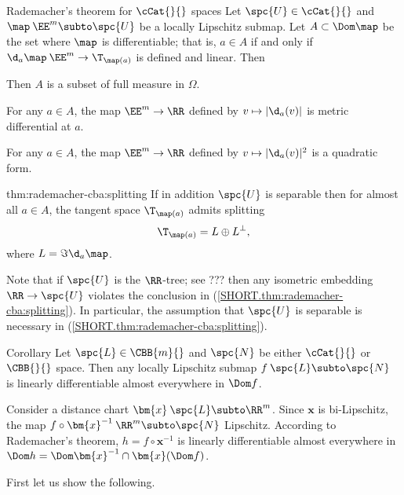 \begin{thm}{Rademacher's theorem for $\cCat{}{}$ spaces}\label{thm:rademacher-cba}
Let $\spc{U}\in\cCat{}{}$  
and $\map\:\EE^m\subto\spc{U}$ be a locally Lipschitz submap.
Let $A\subset \Dom \map$ be the set where $\map$ is differentiable;
that is, $a\in A$ if and only if $\d_a\map\:\EE^m\to\T_{\map(a)}$ is defined and linear.
Then 
\begin{subthm}{}
Then $A$ is a subset of full measure in $\Omega$.
\end{subthm}

\begin{subthm}{}
For any $a\in A$,
the map $\EE^m\to\RR$ defined by $v\mapsto |\d_a(v)|$ is metric differential at $a$.
\end{subthm}

\begin{subthm}{}
For any $a\in A$,
the map $\EE^m\to\RR$ defined by $v\mapsto |\d_a(v)|^2$ is a quadratic form.
\end{subthm}

\begin{subthm}{thm:rademacher-cba:splitting}
If in addition $\spc{U}$ is separable then for almost all $a\in A$, 
the tangent space
$\T_{\map(a)}$ admits splitting
\[\T_{\map(a)}=L\oplus L^\bot,\]
where $L=\Im\d_a\map$.
\end{subthm}
\end{thm}

Note that if $\spc{U}$ is the $\RR$-tree;
see ??? then any isometric embedding $\RR\to \spc{U}$ violates the conclusion in (\ref{SHORT.thm:rademacher-cba:splitting}).
In particular, the assumption that $\spc{U}$ is separable is necessary in (\ref{SHORT.thm:rademacher-cba:splitting}).


\begin{thm}{Corollary}\label{cor:rademacher-cbb-sourse}
Let $\spc{L}\in\CBB{m}{}$ and $\spc{N}$ be either $\cCat{}{}$ or $\CBB{}{}$ space.
Then any locally Lipschitz submap $f\:\spc{L}\subto\spc{N}$ is linearly differentiable almost everywhere in $\Dom f$. 
\end{thm}

Consider a distance chart $\bm{x}\:\spc{L}\subto \RR^m$.
Since $\bm{x}$ is bi-Lipschitz,
the map $f\circ\bm{x}^{-1}\:\RR^m\subto\spc{N}$ Lipschitz.
According to Rademacher's theorem,
$h=f\circ\bm{x}^{-1}$ is linearly differentiable almost everywhere
in $\Dom h=\Dom\bm{x}^{-1}\cap \bm{x}(\Dom f)$.

First let us show the following.

